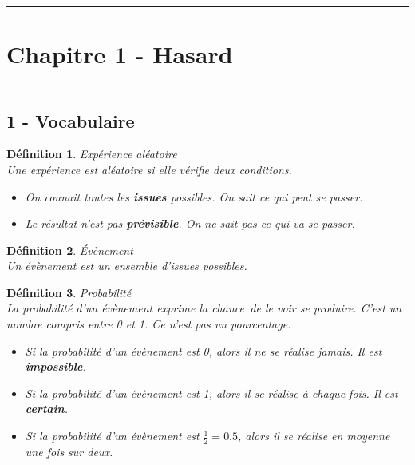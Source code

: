 \documentclass[12pt]{article}
\newcommand{\horrule}[1]{\rule{\linewidth}{#1}} %
\begin{document}

\newtheorem{Definition}{Définition}
\newtheorem{Theorem}{Théorème}
\newtheorem{Proposition}{Propriété}

\renewcommand{\labelitemi}{$\bullet$}
\renewcommand{\labelitemii}{$\circ$}

\setlength{\columnseprule}{1pt}

\horrule{2px}
\section*{Chapitre 1 - Hasard}
\horrule{2px}

\subsection*{1 - Vocabulaire}

\begin{Definition}{Expérience aléatoire}\\
Une expérience est aléatoire si elle vérifie deux conditions.
\begin{itemize}
\item On connait toutes les \textbf{issues} possibles. \textit{On sait ce qui peut se passer.}
\item Le résultat n'est pas \textbf{prévisible}. \textit{On ne sait pas ce qui va se passer.}
\end{itemize}
\end{Definition}

\begin{Definition}{Évènement}\\
Un évènement est un ensemble d'issues possibles.
\end{Definition}

\begin{Definition}{Probabilité}\\
La probabilité d'un évènement exprime la \og chance\fg\, de le voir se produire. C'est un nombre compris entre 0 et 1.  \textit{Ce n'est pas un pourcentage}.

\begin{itemize}
\item Si la probabilité d'un évènement est 0, alors il ne se réalise jamais. Il est \textbf{impossible}.
\item Si la probabilité d'un évènement est 1, alors il se réalise à chaque fois. Il est \textbf{certain}.
\item Si la probabilité d'un évènement est $\frac{1}{2}=0.5$, alors il se réalise en moyenne une fois sur deux. 
\end{itemize}
\end{Definition}
\end{document}
